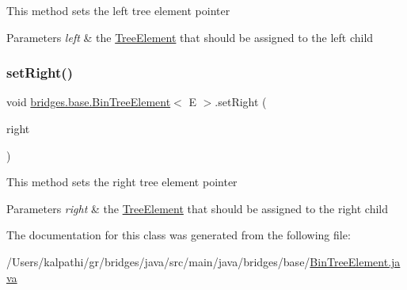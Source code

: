 This method sets the left tree element pointer 
\begin{DoxyParams}{Parameters}
{\em left} & the \mbox{\hyperlink{classbridges_1_1base_1_1_tree_element}{Tree\+Element}} that should be assigned to the left child \\
\hline
\end{DoxyParams}
\mbox{\label{classbridges_1_1base_1_1_bin_tree_element_abc40e3ed4cfaf4b74aacfd3657e89ebc}} 
\subsubsection{\texorpdfstring{setRight()}{setRight()}}
{\footnotesize\ttfamily void \mbox{\hyperlink{classbridges_1_1base_1_1_bin_tree_element}{bridges.\+base.\+Bin\+Tree\+Element}}$<$ E $>$.set\+Right (\begin{DoxyParamCaption}\item[{\mbox{\hyperlink{classbridges_1_1base_1_1_bin_tree_element}{Bin\+Tree\+Element}}$<$ E $>$}]{right }\end{DoxyParamCaption})}

This method sets the right tree element pointer


\begin{DoxyParams}{Parameters}
{\em right} & the \mbox{\hyperlink{classbridges_1_1base_1_1_tree_element}{Tree\+Element}} that should be assigned to the right child \\
\hline
\end{DoxyParams}


The documentation for this class was generated from the following file\+:\begin{DoxyCompactItemize}
\item 
/\+Users/kalpathi/gr/bridges/java/src/main/java/bridges/base/\mbox{\hyperlink{_bin_tree_element_8java}{Bin\+Tree\+Element.\+java}}\end{DoxyCompactItemize}
